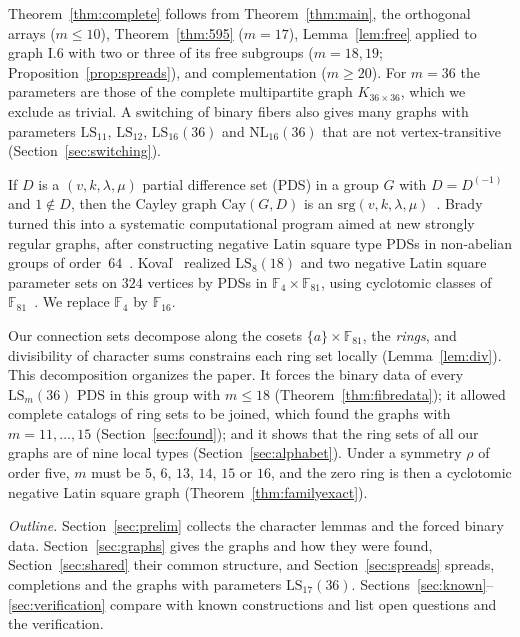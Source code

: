 \documentclass[11pt]{amsart}
\theoremstyle{definition}
\newcommand{\F}{\mathbb{F}}
\newcommand{\srg}{\mathrm{srg}}
\newcommand{\Cay}{\mathrm{Cay}}
\newcommand{\LS}{\mathrm{LS}}
\newcommand{\NL}{\mathrm{NL}}
\begin{document}
Theorem~\ref{thm:complete} follows from Theorem~\ref{thm:main}, the orthogonal arrays ($m\le10$), Theorem~\ref{thm:595} ($m=17$), Lemma~\ref{lem:free} applied to graph I.6 with two or three of its free subgroups ($m=18,19$; Proposition~\ref{prop:spreads}), and complementation ($m\ge20$). For $m=36$ the parameters are those of the complete multipartite graph $K_{36\times36}$, which we exclude as trivial. A switching of binary fibers also gives many graphs with parameters $\LS_{11}$, $\LS_{12}$, $\LS_{16}(36)$ and $\NL_{16}(36)$ that are not vertex-transitive (Section~\ref{sec:switching}).

If $D$ is a $(v,k,\lambda,\mu)$ partial difference set (PDS) in a group $G$ with $D=D^{(-1)}$ and $1\notin D$, then the Cayley graph $\Cay(G,D)$ is an $\srg(v,k,\lambda,\mu)$~\cite[Proposition~1.1]{Ma1994}. Brady~\cite{Brady2025} turned this into a systematic computational program aimed at new strongly regular graphs, after constructing negative Latin square type PDSs in non-abelian groups of order~$64$~\cite{Brady2022}. Kova\v{l}~\cite[Section~5]{KovalNew} realized $\LS_8(18)$ and two negative Latin square parameter sets on $324$ vertices by PDSs in $\F_4\times\F_{81}$, using cyclotomic classes of $\F_{81}$~\cite[Construction~5.4]{KovalNew}. We replace $\F_4$ by $\F_{16}$.

Our connection sets decompose along the cosets $\{a\}\times\F_{81}$, the \emph{rings}, and divisibility of character sums constrains each ring set locally (Lemma~\ref{lem:div}). This decomposition organizes the paper. It forces the binary data of every $\LS_m(36)$ PDS in this group with $m\le18$ (Theorem~\ref{thm:fibredata}); it allowed complete catalogs of ring sets to be joined, which found the graphs with $m=11,\dots,15$ (Section~\ref{sec:found}); and it shows that the ring sets of all our graphs are of nine local types (Section~\ref{sec:alphabet}). Under a symmetry $\rho$ of order five, $m$ must be $5$, $6$, $13$, $14$, $15$ or $16$, and the zero ring is then a cyclotomic negative Latin square graph (Theorem~\ref{thm:familyexact}).

\emph{Outline.} Section~\ref{sec:prelim} collects the character lemmas and the forced binary data. Section~\ref{sec:graphs} gives the graphs and how they were found, Section~\ref{sec:shared} their common structure, and Section~\ref{sec:spreads} spreads, completions and the graphs with parameters $\LS_{17}(36)$. Sections~\ref{sec:known}--\ref{sec:verification} compare with known constructions and list open questions and the verification.
\end{document}
